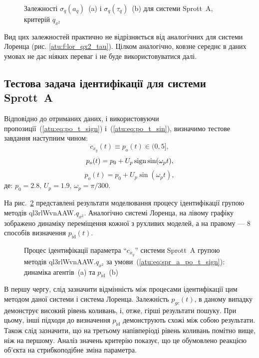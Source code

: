 \begin{figure}[htb!]
  \caption{Залежності $\sigma_{q} (a_q)$~(a) і $\sigma_{q}(\tau_q)$~(b) для системи Sprott~A, критерій $q_{x^2}$}
  \label{atu:f:spr_a_qx2_tau}
\end{figure}

Вид цих залежностей практично не відрізняється від аналогічних
для системи Лоренца (рис. \ref{atu:f:lor_qx2_tau}). Цілком аналогічно,
ковзне середнє в даних умовах не дає ніяких переваг і не буде
використовуватися далі.



\subsection{Тестова задача ідентифікації для системи Sprott~A} %

Відповідно до отриманих даних, і використовуючи
пропозиції~(\ref{atu:eq:po_t_sign}) і~(\ref{atu:eq:po_t_sin}),
%
визначимо тестове завдання наступним чином:
\[
  c_{x_y}(t) \equiv p_o(t) \in (0, 5],
\]
%
\begin{equation}
  p_o(t) = p_0 +  U_{p} \operatorname*{sign} \sin( \omega_{p} t ),
  \label{atu:eq:spr_a_po_t_sign}
\end{equation}
%
%
\begin{equation}
  p_o(t) = p_0 +  U_{p} \sin( \omega_{p} t ),
  \label{atu:eq:spr_a_po_t_sin}
\end{equation}
%
де:
$p_0 = 2.8$, $U_p=1.9$, $\omega_p=\pi/300$.

На рис.~\ref{atu:f:spr_a_id_ql3rlWvnAAW_q_x2_sign}
представлені результати моделювання процесу ідентифікації групою методів ql3rlWvnAAW.$q_{x^2}$.
Аналогічно системі Лоренца, на лівому графіку зображено
динаміку переміщення кожної з рухливих моделей, а на правому ---
8 способів визначення
$p_\mathrm{id} (t)$.

\begin{figure}[htb!]
  \caption{Процес ідентифікації параметра ``$c_{x_y}$'' системи Sprott~A групою методів ql3rlWvnAAW.$q_{x^2}$ за умови~(\ref{atu:eq:spr_a_po_t_sign}): динаміка агентів~(a) та $p_\mathrm{id}$~(b)}
  \label{atu:f:spr_a_id_ql3rlWvnAAW_q_x2_sign}
\end{figure}

В першу чергу, слід зазначити відмінність між процесами
ідентифікації цим методом даної системи і система Лоренца.
Залежність $p_{gc}(t)$, в даному випадку демонструє високий
рівень коливань, і, отже, гірші результати пошуку. При цьому, інші підходи до
визначення $p_\mathrm{id}$ демонструють схожі між собою результати.
Також слід зазначити, що на третьому напівперіоді рівень
коливань помітно вище, ніж на першому. Аналіз значень критерію
показує, що це обумовлено реакцією об'єкта на стрибкоподібне
зміна параметра.



